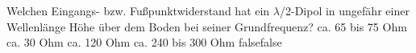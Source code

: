     {Welchen Eingangs- bzw. Fußpunktwiderstand hat ein $\lambda$/2-Dipol in ungefähr einer Wellenlänge Höhe über dem Boden bei seiner Grundfrequenz?}
    {ca. 65 bis 75 Ohm}
    {ca. 30 Ohm}
    {ca. 120 Ohm}
    {ca. 240 bis 300 Ohm}
    {false}{false}